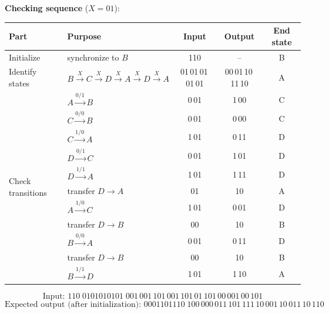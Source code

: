 \documentclass[a4paper, 10pt]{article}
\begin{document}
\begin{solution}
	\noindent\textbf{Checking sequence} (\(X = 01\)):
	\begin{center}
		\setlength{\tabcolsep}{4pt}
		\begin{tabular}{l|l|c|c|c}
			\toprule
			Part & Purpose & Input & Output & End state \\
			\midrule
			Initialize & synchronize to \(B\) & 110 & -- & B \\
			\midrule
			Identify states & \(B\xrightarrow{X}C\xrightarrow{X}D\xrightarrow{X}A\xrightarrow{X}D\xrightarrow{X}A\) & 01\,01\,01\,01\,01 & 00\,01\,10\,11\,10 & A \\
			\midrule
			\multirow{11}{*}{Check transitions}
			 & \(A\xrightarrow{0/1}B\) & 0\,01 & 1\,00 & C \\
			 & \(C\xrightarrow{0/0}B\) & 0\,01 & 0\,00 & C \\
			 & \(C\xrightarrow{1/0}A\) & 1\,01 & 0\,11 & D \\
			 & \(D\xrightarrow{0/1}C\) & 0\,01 & 1\,01 & D \\
			 & \(D\xrightarrow{1/1}A\) & 1\,01 & 1\,11 & D \\
			 & transfer \(D\to A\)     & 01    & 10    & A \\
			 & \(A\xrightarrow{1/0}C\) & 1\,01 & 0\,01 & D \\
			 & transfer \(D\to B\)     & 00    & 10    & B \\
			 & \(B\xrightarrow{0/0}A\) & 0\,01 & 0\,11 & D \\
			 & transfer \(D\to B\)     & 00    & 10    & B \\
			 & \(B\xrightarrow{1/1}D\) & 1\,01 & 1\,10 & A \\
			\bottomrule
		\end{tabular}
	\end{center}
	\[
		\boxed{\text{Input: } 110\;0101010101\;001\,001\,101\,001\,101\,01\,101\,00\,001\,00\,101}
	\]
	\[
		\text{Expected output (after initialization): } 0001101110\;100\,000\,011\,101\,111\,10\,001\,10\,011\,10\,110
	\]
\end{solution}
\end{document}
